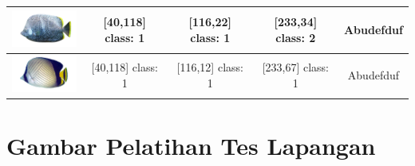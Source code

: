 \begin{longtable}{|c|c|c|c|c|}
	\includegraphics[width=3cm]{gambar/dataset_validasi/Chaetodon24} & [40,118] class: 1 & [116,22] class: 1 & [233,34] class: 2 & Abudefduf \\ \hline
	\includegraphics[width=3cm]{gambar/dataset_validasi/Chaetodon25} & [40,118] class: 1 & [116,12] class: 1 & [233,67] class: 1 & Abudefduf \\ \hline

	
  \end{longtable}

\chapter{Gambar Pelatihan Tes Lapangan}

